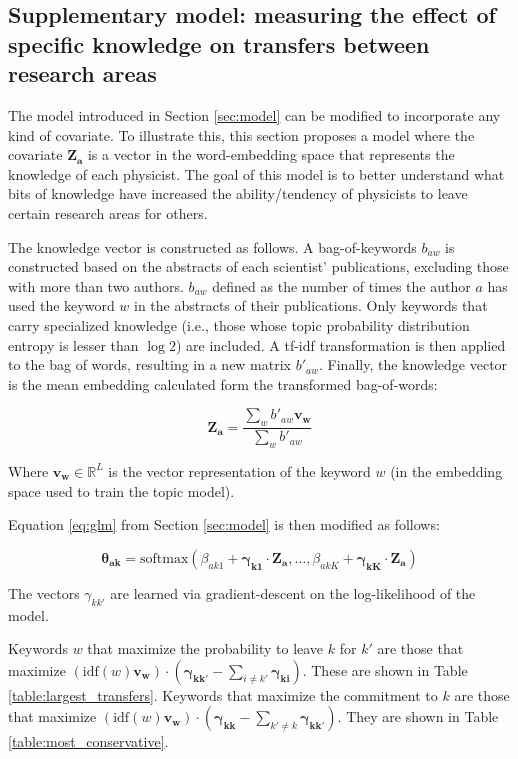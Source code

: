\documentclass{article}
\begin{document}
\subsection{\label{appendix:knowledge}Supplementary model: measuring the effect of specific knowledge on transfers between research areas}

The model introduced in Section \ref{sec:model} can be modified to incorporate any kind of covariate. To illustrate this, this section proposes a model where the covariate $\bm{Z_a}$ is a vector in the word-embedding space that represents the knowledge of each physicist. The goal of this model is to better understand what bits of knowledge have increased the ability/tendency of physicists to leave certain research areas for others. 

The knowledge vector is constructed as follows. A bag-of-keywords $b_{aw}$ is constructed based on the abstracts of each scientist' publications, excluding those with more than two authors. $b_{aw}$ defined as the number of times the author $a$ has used the keyword $w$ in the abstracts of their publications. Only keywords that carry specialized knowledge (i.e., those whose topic probability distribution entropy is lesser than $\log 2$) are included. A tf-idf transformation is then applied to the bag of words, resulting in a new matrix $b'_{aw}$. Finally, the knowledge vector is the mean embedding calculated form the transformed bag-of-words:

\begin{equation}
    \bm{Z_{a}} = \dfrac{\sum_w b'_{aw} \bm{v_{w}}}{\sum_w b'_{aw}} 
\end{equation}

Where $\bm{v_w}\in\mathbb{R}^{L}$ is the vector representation of the keyword $w$ (in the embedding space used to train the topic model). 

Equation \eqref{eq:glm} from Section \ref{sec:model} is then modified as follows:

\begin{equation}
    \bm{\theta_{ak}} = \text{softmax}\left(\beta_{ak1} + \bm{\gamma_{k1}}\cdot \bm{Z_{a}}, \dots,\beta_{akK} +  \bm{\gamma_{kK}}\cdot \bm{Z_{a}} \right)
\end{equation}

The vectors $\gamma_{kk'}$ are learned via gradient-descent on the log-likelihood of the model.

Keywords $w$ that maximize the probability to leave $k$ for $k'$ are those that maximize $(\text{idf}(w) \bm{v_w}) \cdot (\bm{\gamma_{kk'}}-\sum_{i \neq k'}\bm{\gamma_{ki}})$. These are shown in Table \ref{table:largest_transfers}.
Keywords that maximize the commitment to $k$ are those that maximize $ (\text{idf}(w) \bm{v_w}) \cdot (\bm{\gamma_{kk}}-\sum_{k' \neq k}\bm{\gamma_{kk'}})$. They are shown in Table \ref{table:most_conservative}.

\fontsize{6}{7}\selectfont\normalsize
\fontsize{6}{7}\selectfont\normalsize

\end{document}
